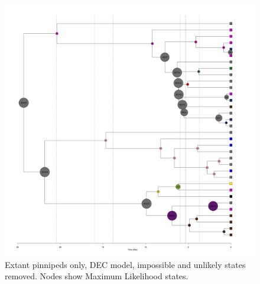 \documentclass[a4paper, 12pt]{article}
\begin{document}

\begin{figure}[H]
 \centering
  \includegraphics[width = \linewidth]{figures/extant-pinnipeds-DEC-unlikely-MLstates.png}
  \caption{Extant pinnipeds only, DEC model, impossible and unlikely states removed. Nodes show Maximum Likelihood states.}
  \label{fig-extant-dec-ml-unlikely}
\end{figure} 
\end{document}
